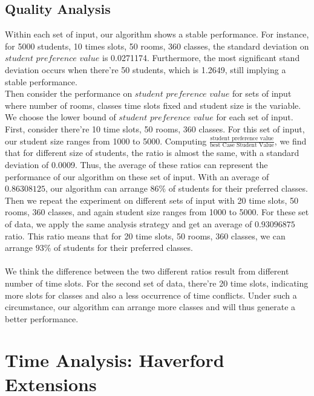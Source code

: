\documentclass[11pt, oneside]{article}   	%
\begin{document}
\subsection{Quality Analysis}
Within each set of input, our algorithm shows a stable performance. For instance, for 5000 students, 10 times slots, 50 rooms, 360 classes, the standard deviation on $student$  $preference$  $value$ is 0.0271174. Furthermore, the most significant stand deviation occurs when there're 50 students, which is 1.2649, still implying a stable performance. 
\\Then consider the performance on $student$ $preference$ $value$ for sets of input where number of rooms, classes time slots fixed and student size is the variable. We choose the lower bound of $student$ $preference$ $value$ for each set of input. First, consider there're 10 time slots, 50 rooms, 360 classes. For this set of input, our student size ranges from 1000 to 5000. Computing $\frac{\text{student preference value}}{\text{best Case Student Value}}$, we find that for different size of students, the ratio is almost the same, with a standard deviation of 0.0009. Thus, the average of these ratios can represent the performance of our algorithm on these set of input. With an average of $0.86308125$, our algorithm can arrange $86\%$ of students for their preferred classes. Then we repeat the experiment on different sets of input with 20 time slots, 50 rooms, 360 classes, and again student size ranges from 1000 to 5000. For these set of data, we apply the same analysis strategy and get an average of $0.93096875$ ratio. This ratio means that for 20 time slots, 50 rooms, 360 classes, we can arrange $93\%$ of students for their preferred classes.\\
\\We think the difference between the two different ratios result from different number of time slots. For the second set of data, there're 20 time slots, indicating more slots for classes and also a less occurrence of time conflicts. Under such a circumstance, our algorithm can arrange more classes and will thus generate a better performance.
\section{Time Analysis: Haverford Extensions}
\end{document}
